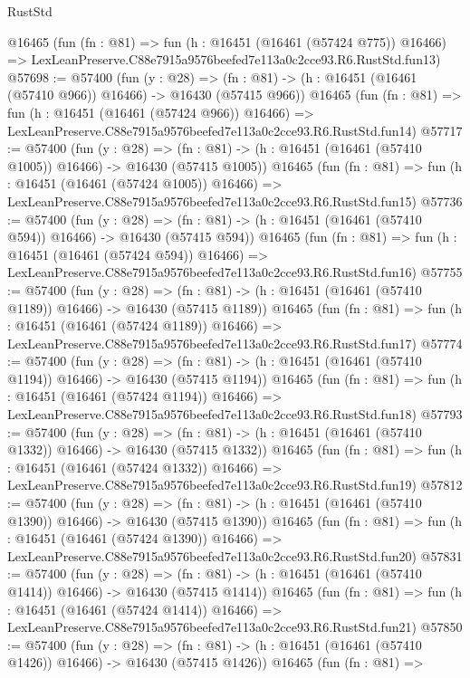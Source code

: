 \begin{lexlean}{RustStd}
\begin{coremodule}
    @16465
    (fun (fn : @81) =>
    fun (h : @16451 (@16461 (@57424 @775)) @16466) =>
    LexLeanPreserve.C88e7915a9576beefed7e113a0c2cce93.R6.RustStd.fun13)
@57698 := @57400
    (fun (y : @28) =>
    (fn : @81) -> (h : @16451 (@16461 (@57410 @966)) @16466) -> @16430 (@57415 @966))
    @16465
    (fun (fn : @81) =>
    fun (h : @16451 (@16461 (@57424 @966)) @16466) =>
    LexLeanPreserve.C88e7915a9576beefed7e113a0c2cce93.R6.RustStd.fun14)
@57717 := @57400
    (fun (y : @28) =>
    (fn : @81) -> (h : @16451 (@16461 (@57410 @1005)) @16466) -> @16430 (@57415 @1005))
    @16465
    (fun (fn : @81) =>
    fun (h : @16451 (@16461 (@57424 @1005)) @16466) =>
    LexLeanPreserve.C88e7915a9576beefed7e113a0c2cce93.R6.RustStd.fun15)
@57736 := @57400
    (fun (y : @28) =>
    (fn : @81) -> (h : @16451 (@16461 (@57410 @594)) @16466) -> @16430 (@57415 @594))
    @16465
    (fun (fn : @81) =>
    fun (h : @16451 (@16461 (@57424 @594)) @16466) =>
    LexLeanPreserve.C88e7915a9576beefed7e113a0c2cce93.R6.RustStd.fun16)
@57755 := @57400
    (fun (y : @28) =>
    (fn : @81) -> (h : @16451 (@16461 (@57410 @1189)) @16466) -> @16430 (@57415 @1189))
    @16465
    (fun (fn : @81) =>
    fun (h : @16451 (@16461 (@57424 @1189)) @16466) =>
    LexLeanPreserve.C88e7915a9576beefed7e113a0c2cce93.R6.RustStd.fun17)
@57774 := @57400
    (fun (y : @28) =>
    (fn : @81) -> (h : @16451 (@16461 (@57410 @1194)) @16466) -> @16430 (@57415 @1194))
    @16465
    (fun (fn : @81) =>
    fun (h : @16451 (@16461 (@57424 @1194)) @16466) =>
    LexLeanPreserve.C88e7915a9576beefed7e113a0c2cce93.R6.RustStd.fun18)
@57793 := @57400
    (fun (y : @28) =>
    (fn : @81) -> (h : @16451 (@16461 (@57410 @1332)) @16466) -> @16430 (@57415 @1332))
    @16465
    (fun (fn : @81) =>
    fun (h : @16451 (@16461 (@57424 @1332)) @16466) =>
    LexLeanPreserve.C88e7915a9576beefed7e113a0c2cce93.R6.RustStd.fun19)
@57812 := @57400
    (fun (y : @28) =>
    (fn : @81) -> (h : @16451 (@16461 (@57410 @1390)) @16466) -> @16430 (@57415 @1390))
    @16465
    (fun (fn : @81) =>
    fun (h : @16451 (@16461 (@57424 @1390)) @16466) =>
    LexLeanPreserve.C88e7915a9576beefed7e113a0c2cce93.R6.RustStd.fun20)
@57831 := @57400
    (fun (y : @28) =>
    (fn : @81) -> (h : @16451 (@16461 (@57410 @1414)) @16466) -> @16430 (@57415 @1414))
    @16465
    (fun (fn : @81) =>
    fun (h : @16451 (@16461 (@57424 @1414)) @16466) =>
    LexLeanPreserve.C88e7915a9576beefed7e113a0c2cce93.R6.RustStd.fun21)
@57850 := @57400
    (fun (y : @28) =>
    (fn : @81) -> (h : @16451 (@16461 (@57410 @1426)) @16466) -> @16430 (@57415 @1426))
    @16465
    (fun (fn : @81) =>

\end{coremodule}
\end{lexlean}
